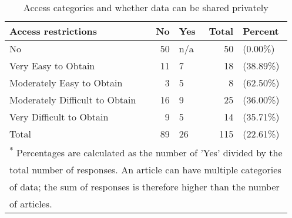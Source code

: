 \begin{table}[!h]
\centering
\caption{\label{tab:access_provision}Access categories and whether data can be shared privately}
\centering
\begin{tabular}[t]{lrlrl}
\toprule
Access restrictions & No & Yes & Total & Percent\\
\midrule
No & 50 & n/a & 50 & (0.00\%)\\
Very Easy to Obtain & 11 & 7 & 18 & (38.89\%)\\
Moderately Easy to Obtain & 3 & 5 & 8 & (62.50\%)\\
Moderately Difficult to Obtain & 16 & 9 & 25 & (36.00\%)\\
Very Difficult to Obtain & 9 & 5 & 14 & (35.71\%)\\
\addlinespace
Total & 89 & 26 & 115 & (22.61\%)\\
\bottomrule
\multicolumn{5}{l}{\textsuperscript{*} Percentages are calculated as the number of 'Yes' divided by the}\\
\multicolumn{5}{l}{total number of responses. An article can have multiple categories}\\
\multicolumn{5}{l}{of data; the sum of responses is therefore higher than the number}\\
\multicolumn{5}{l}{of articles.}\\
\end{tabular}
\end{table}
